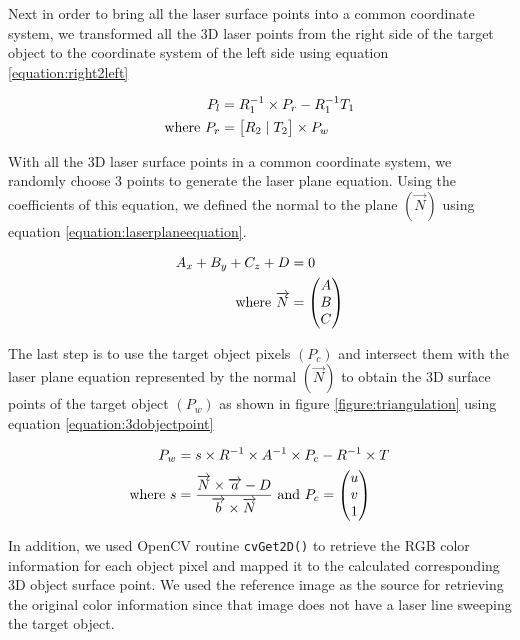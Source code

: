 Next in order to bring all the laser surface points into a common coordinate
system, we transformed all the 3D laser points from the right side of the
target object to the coordinate system of the left side using equation
\ref{equation:right2left}

\begin{align}
	\label{equation:right2left}
	P_{l} &= R_1^{-1} \times P_{r} - R_1^{-1}T_1 \\
	\text{where}~
	P_{r} &= \begin{bmatrix}
									R_2 \mid T_2
 				  \end{bmatrix} \times P_w \notag
\end{align}

With all the 3D laser surface points in a common coordinate system, we
randomly choose 3 points to generate the laser plane equation. Using the
coefficients of this equation, we defined the normal to the plane
$(\overrightarrow{N})$ using equation \ref{equation:laserplaneequation}.

\begin{align}
	\label{equation:laserplaneequation}
	A_x + B_y + C_z + D &= 0 \\
	\text{where}~
	 \overrightarrow{N} &=
	 \begin{pmatrix}
	  A \\
	  B \\
	  C \\
	 \end{pmatrix} \notag
\end{align}

The last step is to use the target object pixels $(P_c)$ and intersect them
with the laser plane equation represented by the normal $(\overrightarrow{N})$
to obtain the 3D surface points of the target object $(P_w)$ as shown in
figure \ref{figure:triangulation} using equation \ref{equation:3dobjectpoint}

\begin{align}
	\label{equation:3dobjectpoint}
	P_w &= s \times R^{-1}
 					 \times A^{-1}
					 \times P_c
					- R^{-1} \times T \\
	\text{where}~
	s &= \frac{\overrightarrow{N}\times\overrightarrow{a} - D}
						{\overrightarrow{b}\times\overrightarrow{N}}
  ~\text{and}~ P_c = \begin{pmatrix}
												u \\
												v \\
												1 \\
										 \end{pmatrix} \notag
\end{align}

In addition, we used OpenCV routine \texttt{cvGet2D()} to retrieve the RGB
color information for each object pixel and mapped it to the calculated
corresponding 3D object surface point. We used the reference image as the
source for retrieving the original color information since that image does not
have a laser line sweeping the target object.
